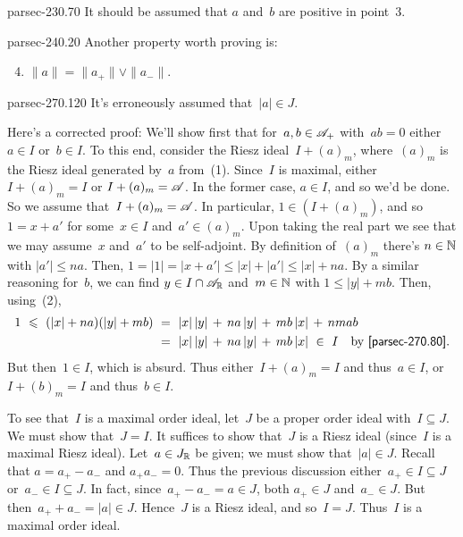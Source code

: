 \documentclass[b5page]{book}
\begin{document}
\begin{erratum}{parsec-230.70}
It should be assumed that $a$ and~$b$ are
positive in point~3.
\end{erratum}
\begin{addendum}{parsec-240.20}
Another property worth proving is:
\begin{enumerate}
\setcounter{enumi}{3}
\item
$\|a\|=\|a_+\|\vee \|a_-\|$.
\end{enumerate}
\end{addendum}
\begin{erratum}{parsec-270.120}
It's erroneously assumed that~$\left|a\right|\in J$.

Here's a corrected proof:
We'll show first that for~$a,b\in\mathscr{A}_+$
with~$ab=0$ either $a\in I$ or~$b\in I$.
To this end, consider
the Riesz ideal~$I+(a)_m$,
where~$(a)_m$ is the Riesz ideal generated by~$a$
from~(1).
Since~$I$ is maximal, either~$I+(a)_m=I$
or
$I+(a)_m=\mathscr{A}$.
In the former case, $a\in I$, 
and so we'd be done.
So we assume that~$I+(a)_m=\mathscr{A}$.
In particular, $1 \in (I+(a)_m)$,
and so~$1=x+a'$ for some~$x\in I$ and~$a'\in (a)_m$.
Upon taking the real part
we see that we may assume~$x$ and~$a'$ to be self-adjoint.
By definition of~$(a)_m$ there's $n\in \mathbb{N}$ with 
$\left|a'\right|\leq na$.
Then, $1=\left|1\right|=\left|x+a'\right|
\leq \left|x\right| + \left|a'\right|
\leq \left|x\right| + na$.
By a similar reasoning for~$b$,
we can find $y\in I\cap\mathscr{A}_{\mathbb{R}}$
and~$m\in\mathbb{N}$ with $1\leq\left|y\right|+mb$.
Then,
using~(2),
\begin{alignat*}{3}
1 \ \leq\ (\left|x\right| + na)(\left|y\right|+mb)
\ &= \ \left|x\right|\left|y\right| \,+\,
na\left|y\right|\,+\, mb\left|x\right|\,+\,nmab\\
\ &= \ \left|x\right|\left|y\right| \,+\,
na\left|y\right|\,+\, mb\left|x\right|
\ \in\ I\quad \text{by \sref{parsec-270.80}.}
\end{alignat*}
But then~$1\in I$, which is absurd.
Thus either~$I+(a)_m=I$ and thus~$a\in I$,
or~$I+(b)_m = I$ and thus~$b\in I$.

To see that~$I$ is a maximal order ideal,
let~$J$ be a proper order ideal with~$I\subseteq J$.
We must show that~$J=I$.
It suffices to show that~$J$ is a Riesz ideal
(since~$I$ is a maximal Riesz ideal).
Let~$a\in J_{\mathbb{R}}$ be given;
we must show that~$\left|a\right|\in J$.
Recall that $a=a_+-a_-$ and $a_+a_-=0$.
Thus the previous discussion either~$a_+\in I\subseteq J$
or~$a_-\in I\subseteq J$.
In fact, since~$a_+-a_- = a\in J$,
both $a_+\in  J$ and~$a_-\in J$.
But then~$a_++a_- = \left|a\right| \in J$.
Hence~$J$ is a Riesz ideal,
and so~$I=J$.
Thus~$I$ is a maximal order ideal.
\end{erratum}
\end{document}
